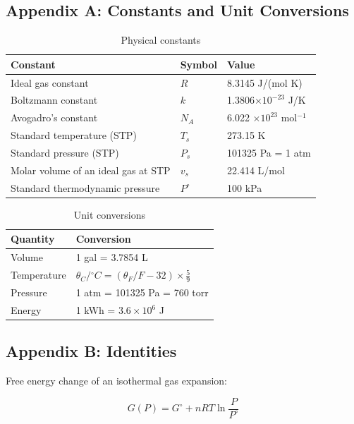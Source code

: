 \documentclass[11pt]{article}
\begin{document}
\vfill

\clearpage

\subsection*{Appendix A: Constants and Unit Conversions}

\begin{table}[htbp]
  \begin{tabular}{lll}
    Constant & Symbol & Value \\
    \hline
    Ideal gas constant & $R$ & 8.3145 J/(mol K) \\
    Boltzmann constant & $k$ & 1.3806$\times 10^{-23}$ J/K \\
    Avogadro's constant & $N_A$ & 6.022 $\times 10^{23}$ mol$^{-1}$ \\
    Standard temperature (STP) & $T_s$ & 273.15 K \\
    Standard pressure (STP) & $P_s$ & 101325 Pa = 1 atm \\
    Molar volume of an ideal gas at STP & $v_s$ & 22.414 L/mol \\
    Standard thermodynamic pressure & $P^{\circ}$ & 100 kPa \\
  \end{tabular}
  \caption{Physical constants}
  \label{tab:const}
\end{table}

\bigskip

\begin{table}[htbp]
  \begin{tabular}{ll}
    Quantity & Conversion \\
    \hline
    Volume & 1 gal = 3.7854 L \\
    Temperature & $\theta_C/{^\circ} C = \left (\theta_F/F - 32
    \right ) \times \frac{5}{9}$ \\
    Pressure & 1 atm = 101325 Pa = 760 torr \\
    Energy & 1 kWh = $3.6\times 10^6$ J
  \end{tabular}
  \caption{Unit conversions}
  \label{tab:const}
\end{table}


\subsection*{Appendix B: Identities}

Free energy change of an isothermal gas expansion:

\begin{equation*}
  G(P) = G^\circ + nRT\ln\frac{P}{P^\circ}
\end{equation*}
\end{document}
